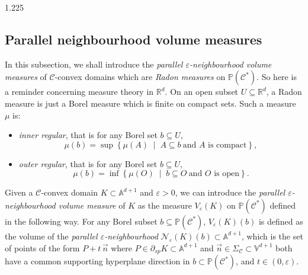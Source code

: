 \documentclass[reqno, a4paper]{amsart}
\numberwithin{equation}{section}
\numberwithin{figure}{section}
\theoremstyle{definition}
\theoremstyle{remark}
\newcommand{\R}{\mathbb{R}} %
\newcommand{\V}{\mathbb{V}} %
\newcommand{\A}{\mathbb{A}} %
\renewcommand{\P}{\mathbb{P}} %
\newcommand{\C}{\mathcal{C}} %
\renewcommand{\S}{\Sigma_\C} %
\newcommand{\st}{\; \middle\vert \;} %
\begin{document}
\begin{spacing}{1.225}
\label{sec area meas}


\subsection{Parallel neighbourhood volume measures}
\label{subsec parallel neighbourhoods}


In this subsection, we shall introduce the \emph{parallel $\varepsilon$-neighbourhood volume measures} of $\C$-convex domains which are \emph{Radon measures} on $\P(\C^*)$. So here is a reminder concerning measure theory in $\R^d$. On an open subset $U \subseteq \R^d$, a Radon measure is just a Borel measure which is finite on compact sets. Such a measure $\mu$ is: 
\begin{itemize}
 \item \emph{inner regular}, that is for any Borel set $b\subseteq U$,
 \begin{equation*}
 \mu(b) = \sup \left\lbrace \mu(A) \st A \subseteq b \ \text{and $A$ is compact} \right\rbrace ,
 \end{equation*}
 \item \emph{outer regular}, that is for any Borel set $b\subseteq U$,
 \begin{equation*}
 \mu(b) = \inf \left\lbrace \mu(O) \st b \subseteq O \ \text{and $O$ is open} \right\rbrace . 
 \end{equation*}
\end{itemize}

Given a $\C$-convex domain $K \subset \A^{d+1}$ and $\varepsilon>0$, we can introduce the \emph{parallel $\varepsilon$-neighbourhood volume measure} of $K$ as the measure $V_\varepsilon(K)$ on $\P(\C^*)$ defined in the following way. For any Borel subset $b \subseteq \P(\C^*)$, $V_\varepsilon(K)(b)$ is defined as the volume of the \emph{parallel $\varepsilon$-neighbourhood} $\mathcal{N}_\varepsilon(K)(b) \subset \A^{d+1}$, which is the set of points of the form $P + t \, \vec{n} $ where $P \in \partial_{sp} K \subset \A^{d+1}$ and $\vec{n}\in \S \subset\V^{d+1}$ both have a common supporting hyperplane direction in $b \subset \P(\C^*)$, and $t \in (0,\varepsilon)$.


\end{spacing}
\end{document}
